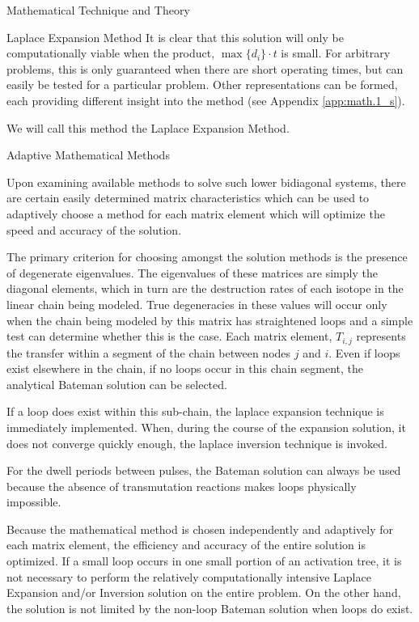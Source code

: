 \begin{chapter}{Mathematical Technique and Theory\label{chap:math}}
\begin{section}{Laplace Expansion Method}
    It is clear that this solution will only be computationally viable
    when the product, $\max \{d_i\} \cdot t$ is small.  For arbitrary
    problems, this is only guaranteed when there are short operating
    times, but can easily be tested for a particular problem.  Other
    representations can be formed, each providing different insight
    into the method (see Appendix \ref{app:math.1_s}).
    
    We will call this method the Laplace Expansion Method.

  \end{section}
  
  \begin{section}{Adaptive Mathematical Methods\label{sec:math.adaptive}}
  
    Upon examining available methods to solve such lower bidiagonal
    systems, there are certain easily determined matrix
    characteristics which can be used to adaptively choose a method
    for each matrix element which will optimize the speed and accuracy
    of the solution.
  
    The primary criterion for choosing amongst the solution methods is
    the presence of degenerate eigenvalues.  The eigenvalues of these
    matrices are simply the diagonal elements, which in turn are the
    destruction rates of each isotope in the linear chain being
    modeled.  True degeneracies in these values will occur only when
    the chain being modeled by this matrix has straightened loops and
    a simple test can determine whether this is the case.  Each matrix
    element, $T_{i,j}$ represents the transfer within a segment of the
    chain between nodes $j$ and $i$.  Even if loops exist elsewhere in
    the chain, if no loops occur in this chain segment, the analytical
    Bateman solution can be selected.
  
    If a loop does exist within this sub-chain, the laplace expansion
    technique is immediately implemented.  When, during the course of
    the expansion solution, it does not converge quickly enough, the
    laplace inversion technique is invoked.
  
    For the dwell periods between pulses, the Bateman solution can
    always be used because the absence of transmutation reactions
    makes loops physically impossible.
  
    Because the mathematical method is chosen independently and
    adaptively for each matrix element, the efficiency and accuracy of
    the entire solution is optimized.  If a small loop occurs in one
    small portion of an activation tree, it is not necessary to
    perform the relatively computationally intensive Laplace Expansion
    and/or Inversion solution on the entire problem.  On the other
    hand, the solution is not limited by the non-loop Bateman solution
    when loops do exist.


\end{section}
\end{chapter}
